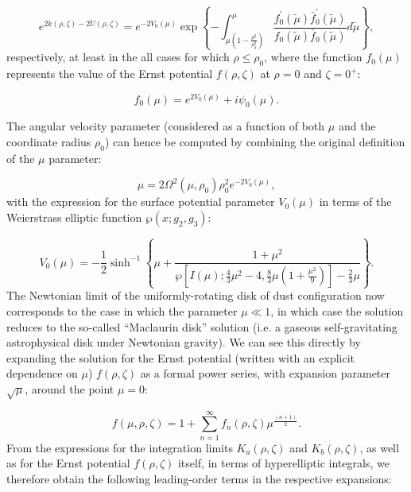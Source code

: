 \documentclass{article}
\begin{document}
\begin{equation}
e^{2 k \left( \rho, \zeta \right) - 2 U \left( \rho, \zeta \right)} = e^{-2 V_0 \left( \mu \right)} \exp \left\lbrace - \int_{\mu \left( 1 - \frac{\rho^2}{\rho_{0}^{2}} \right)}^{\mu} \frac{f_{0}^{\prime} \left( \tilde{\mu} \right) \bar{f}_{0}^{\prime} \left( \tilde{\mu} \right)}{f_0 \left( \tilde{\mu} \right) \bar{f}_0 \left( \tilde{\mu} \right)} d \tilde{\mu} \right\rbrace,
\end{equation}
respectively, at least in the all cases for which ${\rho \leq \rho_0}$, where the function ${f_0 \left( \mu \right)}$ represents the value of the Ernst potential ${f \left( \rho, \zeta \right)}$ at ${\rho = 0}$ and ${\zeta = 0^{+}}$:

\begin{equation}
f_0 \left( \mu \right) = e^{2 V_0 \left( \mu \right)} + i \psi_0 \left( \mu \right).
\end{equation}

The angular velocity parameter (considered as a function of both ${\mu}$ and the coordinate radius ${\rho_0}$) can hence be computed by combining the original definition of the ${\mu}$ parameter:

\begin{equation}
\mu = 2 \Omega^2 \left( \mu, \rho_0 \right) \rho_{0}^{2} e^{-2 V_0 \left( \mu \right)},
\end{equation}
with the expression for the surface potential parameter ${V_0 \left( \mu \right)}$ in terms of the Weierstrass elliptic function ${\wp \left( x ; g_2, g_3 \right)}$:

\begin{equation}
V_0 \left( \mu \right) = - \frac{1}{2} \sinh^{-1} \left\lbrace \mu + \frac{1 + \mu^2}{\wp \left[ I \left( \mu \right) ; \frac{4}{3} \mu^2 - 4, \frac{8}{3} \mu \left( 1 + \frac{\mu^2}{9} \right) \right] - \frac{2}{3} \mu} \right\rbrace.
\end{equation}
The Newtonian limit of the uniformly-rotating disk of dust configuration now corresponds to the case in which the parameter ${\mu \ll 1}$, in which case the solution reduces to the so-called ``Maclaurin disk'' solution (i.e. a gaseous self-gravitating astrophysical disk under Newtonian gravity). We can see this directly by expanding the solution for the Ernst potential (written with an explicit dependence on ${\mu}$) ${f \left( \rho, \zeta \right)}$ as a formal power series, with expansion parameter ${\sqrt{\mu}}$, around the point ${\mu = 0}$:

\begin{equation}
f \left( \mu, \rho, \zeta \right) = 1 + \sum_{n = 1}^{\infty} f_n \left( \rho, \zeta \right) \mu^{\frac{\left( n + 1 \right)}{2}}.
\end{equation}
From the expressions for the integration limits ${K_a \left( \rho, \zeta \right)}$ and ${K_b \left( \rho, \zeta \right)}$, as well as for the Ernst potential ${f \left( \rho, \zeta \right)}$ itself, in terms of hyperelliptic integrals, we therefore obtain the following leading-order terms in the respective expansions:
\end{document}
